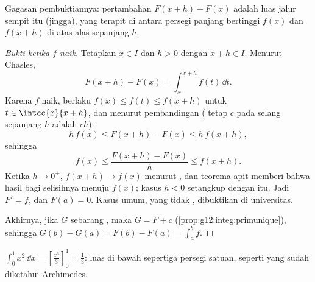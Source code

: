 \begin{omfigure}

{\small Gagasan pembuktiannya: pertambahan $F(x+h) - F(x)$ adalah luas
jalur sempit itu (jingga), yang terapit di antara persegi panjang bertinggi
$f(x)$ dan $f(x+h)$ di atas alas sepanjang $h$.}
\end{omfigure}

\begin{proof}[Bukti ketika $f$ naik]
Tetapkan $x \in I$ dan $h > 0$ dengan $x + h \in I$. Menurut Chasles,
\[
F(x+h) - F(x) = \int_x^{x+h} f(t)\,\dd t .
\]
Karena $f$ naik, berlaku $f(x) \leq f(t) \leq f(x+h)$ untuk
$t \in \intcc{x}{x+h}$, dan menurut pembandingan  ( 
tetap $c$ pada selang sepanjang $h$ adalah $ch$):
\[
h\,f(x) \leq F(x+h) - F(x) \leq h\,f(x+h),
\]
sehingga
\[
f(x) \leq \frac{F(x+h) - F(x)}{h} \leq f(x+h).
\]
Ketika $h \to 0^+$, $f(x+h) \to f(x)$ menurut , dan teorema apit
memberi bahwa hasil bagi selisihnya menuju $f(x)$; kasus $h < 0$ setangkup
dengan itu. Jadi $F' = f$, dan $F(a) = 0$. Kasus  umum, yang tidak
, dibuktikan di universitas.

Akhirnya, jika $G$ sebarang , maka $G = F + c$
(\cref{prop:g12:integ:primunique}), sehingga
$G(b) - G(a) = F(b) - F(a) = \int_a^b f$.
\end{proof}

\begin{example}
$\displaystyle\int_0^1 x^2\,\dd x = \left[\frac{x^3}{3}\right]_0^1 =
\frac13$: luas di bawah  sepertiga persegi satuan, seperti
yang sudah diketahui Archimedes.
\end{example}

